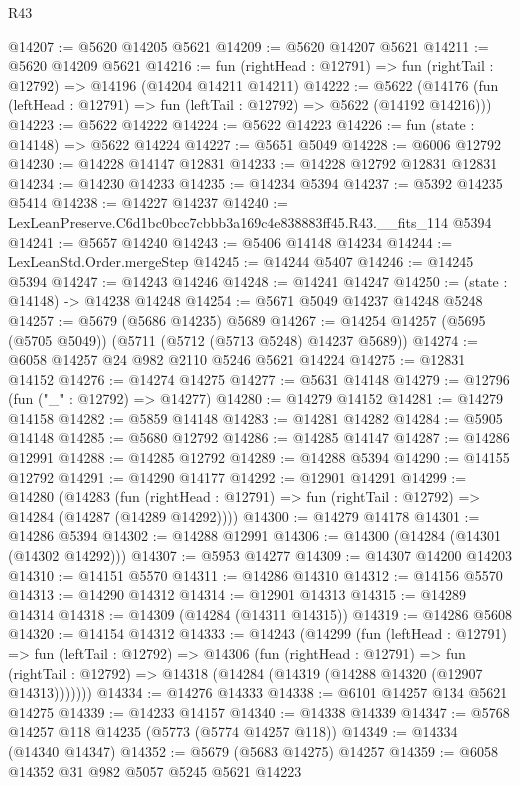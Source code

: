 \begin{lexlean}{R43}
\begin{coremodule}
@14207 := @5620 @14205 @5621
@14209 := @5620 @14207 @5621
@14211 := @5620 @14209 @5621
@14216 := fun (rightHead : @12791) => fun (rightTail : @12792) => @14196 (@14204 @14211 @14211)
@14222 := @5622
    (@14176 (fun (leftHead : @12791) => fun (leftTail : @12792) => @5622 (@14192 @14216)))
@14223 := @5622 @14222
@14224 := @5622 @14223
@14226 := fun (state : @14148) => @5622 @14224
@14227 := @5651 @5049
@14228 := @6006 @12792
@14230 := @14228 @14147 @12831
@14233 := @14228 @12792 @12831 @12831
@14234 := @14230 @14233
@14235 := @14234 @5394
@14237 := @5392 @14235 @5414
@14238 := @14227 @14237
@14240 := LexLeanPreserve.C6d1bc0bcc7cbbb3a169c4e838883ff45.R43.__fits_114 @5394
@14241 := @5657 @14240
@14243 := @5406 @14148 @14234
@14244 := LexLeanStd.Order.mergeStep
@14245 := @14244 @5407
@14246 := @14245 @5394
@14247 := @14243 @14246
@14248 := @14241 @14247
@14250 := (state : @14148) -> @14238 @14248
@14254 := @5671 @5049 @14237 @14248 @5248
@14257 := @5679 (@5686 @14235) @5689
@14267 := @14254 @14257 (@5695 (@5705 @5049)) (@5711 (@5712 (@5713 @5248) @14237 @5689))
@14274 := @6058 @14257 @24 @982 @2110 @5246 @5621 @14224
@14275 := @12831 @14152
@14276 := @14274 @14275
@14277 := @5631 @14148
@14279 := @12796 (fun ("_" : @12792) => @14277)
@14280 := @14279 @14152
@14281 := @14279 @14158
@14282 := @5859 @14148
@14283 := @14281 @14282
@14284 := @5905 @14148
@14285 := @5680 @12792
@14286 := @14285 @14147
@14287 := @14286 @12991
@14288 := @14285 @12792
@14289 := @14288 @5394
@14290 := @14155 @12792
@14291 := @14290 @14177
@14292 := @12901 @14291
@14299 := @14280
    (@14283
      (fun (rightHead : @12791) => fun (rightTail : @12792) => @14284 (@14287 (@14289 @14292))))
@14300 := @14279 @14178
@14301 := @14286 @5394
@14302 := @14288 @12991
@14306 := @14300 (@14284 (@14301 (@14302 @14292)))
@14307 := @5953 @14277
@14309 := @14307 @14200 @14203
@14310 := @14151 @5570
@14311 := @14286 @14310
@14312 := @14156 @5570
@14313 := @14290 @14312
@14314 := @12901 @14313
@14315 := @14289 @14314
@14318 := @14309 (@14284 (@14311 @14315))
@14319 := @14286 @5608
@14320 := @14154 @14312
@14333 := @14243
    (@14299
      (fun (leftHead : @12791) =>
      fun (leftTail : @12792) =>
      @14306
        (fun (rightHead : @12791) =>
        fun (rightTail : @12792) => @14318 (@14284 (@14319 (@14288 @14320 (@12907 @14313)))))))
@14334 := @14276 @14333
@14338 := @6101 @14257 @134 @5621 @14275
@14339 := @14233 @14157
@14340 := @14338 @14339
@14347 := @5768 @14257 @118 @14235 (@5773 (@5774 @14257 @118))
@14349 := @14334 (@14340 @14347)
@14352 := @5679 (@5683 @14275) @14257
@14359 := @6058 @14352 @31 @982 @5057 @5245 @5621 @14223

\end{coremodule}
\end{lexlean}
